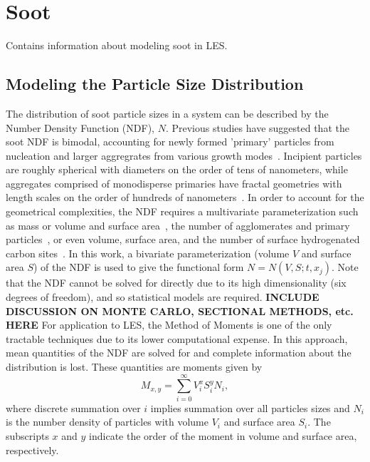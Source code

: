\section{Soot}
\label{sec:lesmodels:soot}

Contains information about modeling soot in LES.


\subsection{Modeling the Particle Size Distribution}
\label{sec:lesmodels:soot:ndf}

The distribution of soot particle sizes in a system can be described by the Number Density Function (NDF), $N$. Previous studies have suggested that the soot NDF is bimodal, accounting for newly formed 'primary' particles from nucleation and larger aggregrates from various growth modes~\cite{zhao2003,zhao2005,netzell2007}. Incipient particles are roughly spherical with diameters on the order of tens of nanometers, while aggregates comprised of monodisperse primaries have fractal geometries with length scales on the order of hundreds of nanometers~\cite{vanderwal1999}. In order to account for the geometrical complexities, the NDF requires a multivariate parameterization such as mass or volume and surface area~\cite{patterson2007,mueller2009,hmom2009}, the number of agglomerates and primary particles~\cite{park2004}, or even volume, surface area, and the number of surface hydrogenated carbon sites~\cite{blanquart2009}. In this work, a bivariate parameterization (volume $V$ and surface area $S$) of the NDF is used to give the functional form $N = N(V, S; t, x_j)$. Note that the NDF cannot be solved for directly due to its high dimensionality (six degrees of freedom), and so statistical models are required. \textbf{INCLUDE DISCUSSION ON MONTE CARLO, SECTIONAL METHODS, etc. HERE} For application to LES, the Method of Moments is one of the only tractable techniques due to its lower computational expense. In this approach, mean quantities of the NDF are solved for and complete information about the distribution is lost. These quantities are moments given by
\begin{equation}\label{eq:lesmodels:soot:ndf:moments}
  M_{x,y} = \sum\limits_{i=0}^\infty V_i^x S_i^y N_i,
\end{equation}
where discrete summation over $i$ implies summation over all particles sizes and $N_i$ is the number density of particles with volume $V_i$ and surface area $S_i$. The subscripts $x$ and $y$ indicate the order of the moment in volume and surface area, respectively.

